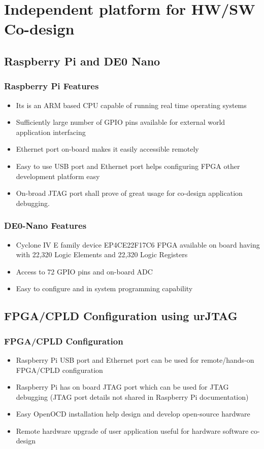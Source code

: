 
\section{Independent platform for HW/SW Co-design}

\subsection{Raspberry Pi and DE0 Nano}

\begin{frame}
\frametitle{Raspberry Pi Features}   %
\begin{itemize}
\item Its is an ARM based CPU capable of running real time operating systems
\item Sufficiently large number of GPIO pins available for external world application interfacing
\item Ethernet port on-board makes it easily accessible remotely
\item Easy to use USB port and Ethernet port helps configuring FPGA other development platform easy
\item On-broad JTAG port shall prove of great usage for co-design application debugging.
\end{itemize} 
\end{frame}



\begin{frame}
\frametitle{DE0-Nano Features}   %
\begin{itemize}
\item Cyclone IV E family device EP4CE22F17C6 FPGA available on board having with 22,320 Logic Elements and 22,320 Logic Registers
\item Access to 72 GPIO pins and on-board ADC
\item Easy to configure and in system programming capability
\end{itemize} 
\end{frame}


\subsection{FPGA/CPLD Configuration using urJTAG}
\begin{frame}
\frametitle{FPGA/CPLD Configuration}   %
\begin{itemize}
\item Raspberry Pi USB port and Ethernet port can be used for remote/hands-on FPGA/CPLD configuration
\item Raspberry Pi has on board JTAG port which can be used for JTAG debugging (JTAG port details not shared in Raspberry Pi documentation)
\item Easy OpenOCD installation help design and develop open-source hardware
\item Remote hardware upgrade of user application useful for hardware software co-design
\end{itemize} 
\end{frame}


